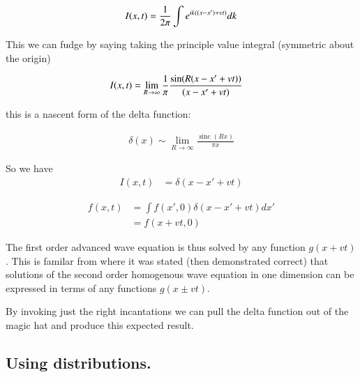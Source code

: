\documentclass{article}
\DeclareMathOperator{\sinc}{sinc}
\begin{document}
\begin{align*}
I(x,t) = \frac{1}{2\pi} \int e^{ i k ((x-x') + v t) } dk
\end{align*}

This we can fudge by saying taking the principle value integral (symmetric about the origin)

\begin{align*}
I(x,t) &= \lim_{R \rightarrow \infty} \frac{1}{\pi} \frac{\sin( R (x-x' + v t) )}{ (x-x' + vt)}
\end{align*}

this is a nascent form of the delta function:

\begin{align*}
\delta(x) \sim \lim_{R \rightarrow \infty} \frac{\sinc( R x )}{\pi x}
\end{align*}

So we have
\begin{align*}
I(x,t) &= \delta(x - x' + v t) 
\end{align*}

\begin{align*}
{{f}}(x,t) 
&= \int f(x',0) \delta(x - x' + v t) dx' \\
&= f(x + v t,0) 
\end{align*}

The first order advanced wave equation is thus solved by any function $g(x + vt)$.  This
is familar from
\cite{french1971vaw} where it was stated (then demonstrated correct) that solutions of the second
order homogenous wave equation in one dimension can be expressed in terms of any functions
$g(x \pm vt)$.

By invoking just the right incantations we can pull the delta function out of the magic hat and 
produce this expected result.

\subsection{ Using distributions. }



\end{document}
